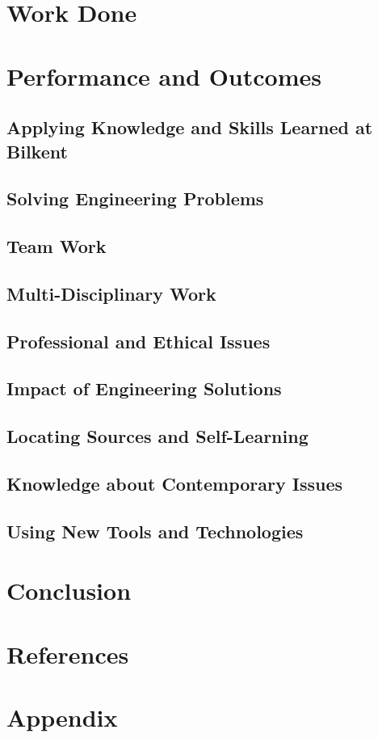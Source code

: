 \documentclass[10pt]{article}
\begin{document}
\section{Work Done}

\section{Performance and Outcomes}

\subsection{Applying Knowledge and Skills Learned at Bilkent}

\subsection{Solving Engineering Problems}

\subsection{Team Work}

\subsection{Multi-Disciplinary Work}

\subsection{Professional and Ethical Issues}

\subsection{Impact of Engineering Solutions}

\subsection{Locating Sources and Self-Learning}

\subsection{Knowledge about Contemporary Issues}

\subsection{Using New Tools and Technologies}

\section{Conclusion}

\section{References}

\begin{thebibliography}{99}

\end{thebibliography}

\section{Appendix}
\end{document}
